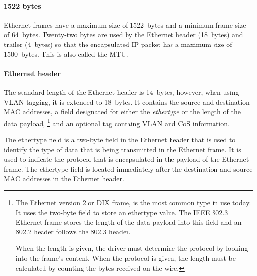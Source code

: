 \paragraph{1522 bytes}
Ethernet frames have a maximum size of 1522~bytes and a minimum frame size of 64~bytes.
Twenty-two bytes are used by the Ethernet header (18~bytes) and trailer (4~bytes) so that the encapsulated \acs{IP} packet has a maximum size of 1500~bytes.
This is also called the \acf{MTU}.


\paragraph{Ethernet header}
The standard length of the Ethernet header is 14~bytes, however, when using \acs{VLAN} tagging, it is extended to 18~bytes.
It contains the source and destination \acs{MAC} addresses, a field designated for either the \emph{ethertype} or the length of the data payload,%
   \footnote{%
      The Ethernet version 2 or \acs{DIX} frame, is the most common type in use today.
      It uses the two-byte field to store an ethertype value.
      The \acs{IEEE} 802.3 Ethernet frame stores the length of the data payload into this field and an 802.2  header follows the 802.3 header.

      When the length is given, the driver must determine the protocol by looking into the frame's content.
      When the protocol is given, the length must be calculated by counting the bytes received on the wire.
   }
and an optional  tag containg \acs{VLAN} and \acs{CoS} information.

The ethertype field is a two-byte field in the Ethernet header that is used to identify the type of data that is being transmitted in the Ethernet frame.
It is used to indicate the protocol that is encapsulated in the payload of the Ethernet frame.
The ethertype field is located immediately after the destination and source \acs{MAC} addresses in the Ethernet header.





